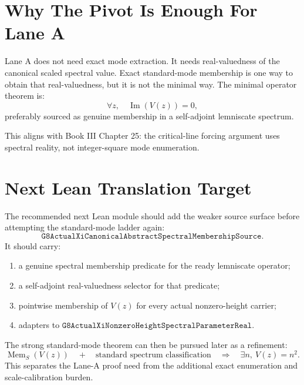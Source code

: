 \documentclass[11pt]{article}
\newcommand{\im}{\operatorname{Im}}
\begin{document}
\section*{Why The Pivot Is Enough For Lane A}

Lane A does not need exact mode extraction.  It needs real-valuedness of the
canonical scaled spectral value.  Exact standard-mode membership is one way to
obtain that real-valuedness, but it is not the minimal way.  The minimal
operator theorem is:
\[
  \forall z,\quad \im(V(z))=0,
\]
preferably sourced as genuine membership in a self-adjoint lemniscate spectrum.

This aligns with Book III Chapter 25: the critical-line forcing argument uses
spectral reality, not integer-square mode enumeration.

\section*{Next Lean Translation Target}

The recommended next Lean module should add the weaker source surface before
attempting the standard-mode ladder again:
\[
  \texttt{G8ActualXiCanonicalAbstractSpectralMembershipSource}.
\]
It should carry:
\begin{enumerate}
\item a genuine spectral membership predicate for the ready lemniscate operator;
\item a self-adjoint real-valuedness selector for that predicate;
\item pointwise membership of \(V(z)\) for every actual nonzero-height carrier;
\item adapters to \(\texttt{G8ActualXiNonzeroHeightSpectralParameterReal}\).
\end{enumerate}

The strong standard-mode theorem can then be pursued later as a refinement:
\[
  \operatorname{Mem}_S(V(z))
  \quad+\quad
  \text{standard spectrum classification}
  \quad\Longrightarrow\quad
  \exists n,\ V(z)=n^2.
\]
This separates the Lane-A proof need from the additional exact enumeration and
scale-calibration burden.
\end{document}

